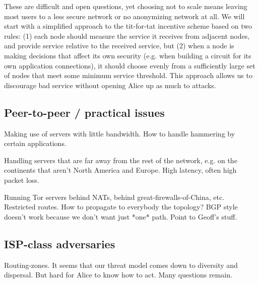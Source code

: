 \documentclass{llncs}
\begin{document}
These are difficult and open questions, yet choosing not to scale means
leaving most users to a less secure network or no anonymizing network
at all.  We will start with a simplified approach to the tit-for-tat
incentive scheme based on two rules: (1) each node should measure the
service it receives from adjacent nodes, and provide service relative to
the received service, but (2) when a node is making decisions that affect
its own security (e.g. when building a circuit for its own application
connections), it should choose evenly from a sufficiently large set of
nodes that meet some minimum service threshold.  This approach allows us
to discourage bad service without opening Alice up as much to attacks.



\subsection{Peer-to-peer / practical issues}

Making use of servers with little bandwidth. How to handle hammering by
certain applications.

Handling servers that are far away from the rest of the network, e.g. on
the continents that aren't North America and Europe. High latency,
often high packet loss.

Running Tor servers behind NATs, behind great-firewalls-of-China, etc.
Restricted routes. How to propagate to everybody the topology? BGP
style doesn't work because we don't want just *one* path. Point to
Geoff's stuff.

\subsection{ISP-class adversaries}

Routing-zones. It seems that our threat model comes down to diversity and
dispersal. But hard for Alice to know how to act. Many questions remain.
\end{document}
